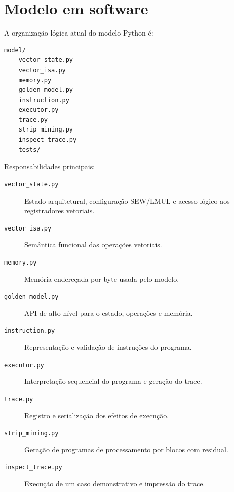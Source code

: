 \section{Modelo em software}

A organização lógica atual do modelo Python é:

\begin{verbatim}
model/
    vector_state.py
    vector_isa.py
    memory.py
    golden_model.py
    instruction.py
    executor.py
    trace.py
    strip_mining.py
    inspect_trace.py
    tests/
\end{verbatim}

Responsabilidades principais:

\begin{description}
    \item[\texttt{vector\_state.py}]
    Estado arquitetural, configuração SEW/LMUL e acesso lógico aos
    registradores vetoriais.

    \item[\texttt{vector\_isa.py}]
    Semântica funcional das operações vetoriais.

    \item[\texttt{memory.py}]
    Memória endereçada por byte usada pelo modelo.

    \item[\texttt{golden\_model.py}]
    API de alto nível para o estado, operações e memória.

    \item[\texttt{instruction.py}]
    Representação e validação de instruções do programa.

    \item[\texttt{executor.py}]
    Interpretação sequencial do programa e geração do trace.

    \item[\texttt{trace.py}]
    Registro e serialização dos efeitos de execução.

    \item[\texttt{strip\_mining.py}]
    Geração de programas de processamento por blocos com residual.

    \item[\texttt{inspect\_trace.py}]
    Execução de um caso demonstrativo e impressão do trace.
\end{description}